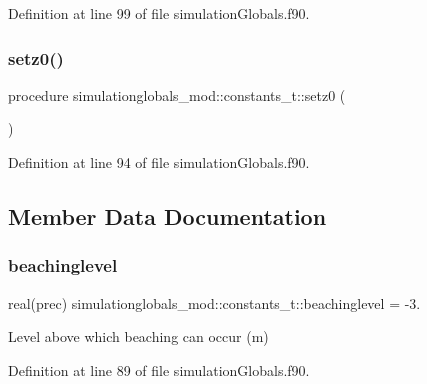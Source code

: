 Definition at line 99 of file simulation\+Globals.\+f90.

\mbox{\label{structsimulationglobals__mod_1_1constants__t_a6517422a0987640f0574bcce3c6566f1}} 
\subsubsection{\texorpdfstring{setz0()}{setz0()}}
{\footnotesize\ttfamily procedure simulationglobals\+\_\+mod\+::constants\+\_\+t\+::setz0 (\begin{DoxyParamCaption}{ }\end{DoxyParamCaption})\hspace{0.3cm}{\ttfamily [private]}}



Definition at line 94 of file simulation\+Globals.\+f90.



\subsection{Member Data Documentation}
\mbox{\label{structsimulationglobals__mod_1_1constants__t_a735a778cb615271495fe8d5dc2b964b7}} 
\subsubsection{\texorpdfstring{beachinglevel}{beachinglevel}}
{\footnotesize\ttfamily real(prec) simulationglobals\+\_\+mod\+::constants\+\_\+t\+::beachinglevel = -\/3.\hspace{0.3cm}{\ttfamily [private]}}



Level above which beaching can occur (m) 



Definition at line 89 of file simulation\+Globals.\+f90.


